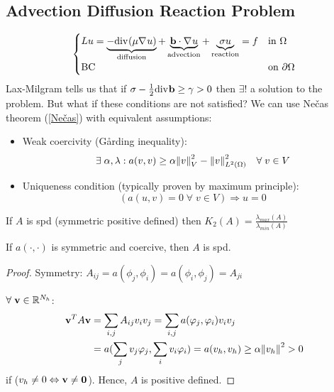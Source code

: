 \subsection{Advection Diffusion Reaction Problem}
\begin{equation*}
   \begin{cases}
       Lu = \underbrace{-\text{div}\mspace{1mu} (\mu\nabla\mspace{1mu} u)}_{\text{diffusion}} + \underbrace{\textbf{b} \cdot \nabla\mspace{1mu} u}_{\text{advection}} + \underbrace{\sigma u}_{\text{reaction}} = f & \text{in }\Omega \\
       \text{BC }& \text{on }\partial\Omega\\
   \end{cases}
\end{equation*}
Lax-Milgram tells us that if \(\sigma - \frac{1}{2}\text{div}\mspace{1mu}\textbf{b} \geq \gamma > 0\) then \(\exists!\) a solution to the problem. But what if these conditions are not satisfied? We can use Nečas theorem (\eqref{Nečas}) with equivalent assumptions:
\begin{itemize}
    \item Weak coercivity (Gårding inequality): 
    \[
        \exists \; \alpha, \lambda : a(v,v) \geq \alpha \norm{v}_V^2-\norm{v}_{L^2(\Omega)}^2 \quad \forall \; v \in V
    \]
    \item Uniqueness condition (typically proven by maximum principle):
    \[
        (a(u,v) = 0 \; \forall \; v \in V) \Rightarrow u = 0
    \]
\end{itemize}
If \(A\) is spd (symmetric positive defined) then \(K_2(A) = \frac{\lambda_{max}(A)}{\lambda_{min}(A)}\)

    \begin{proposition}
        If \(a(\cdot,\cdot)\) is symmetric and coercive, then \(A\) is spd.
    \end{proposition}

    \begin{proof}
        Symmetry: \(A_{ij} = a(\phi_j,\phi_i) = a(\phi_i,\phi_j) = A_{ji}\)

        \(\forall \; \textbf{v} \in \mathbb{R}^{N_h}\):
        \begin{align*}
            \textbf{v}^TA\textbf{v} & = \sum_{i,j}A_{ij}v_iv_j = \sum_{i,j}a(\varphi_j, \varphi_i)v_i v_j \\
            & = a(\sum_j v_j \varphi_j, \sum_i v_i \varphi_i) = a(v_h, v_h) \geq \alpha\norm{v_h}^2 > 0
        \end{align*}
    if (\(v_h \neq 0 \Leftrightarrow \textbf{v} \neq \textbf{0}\)). Hence, \(A\) is positive defined.
    \end{proof}


